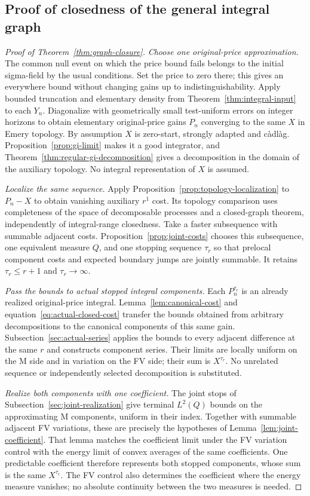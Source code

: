 \subsection{Proof of closedness of the general integral graph}
\label{sec:closure-proof}
\begin{proof}[Proof of Theorem~\ref{thm:graph-closure}]
\emph{Choose one original-price approximation.}
The common null event on which the price bound fails belongs to the initial sigma-field by the usual conditions. Set the price to zero there; this gives an everywhere bound without changing gains up to indistinguishability. Apply bounded truncation and elementary density from
Theorem~\ref{thm:integral-input} to each $Y_n$.
Diagonalize with geometrically small test-uniform errors on integer horizons
to obtain elementary original-price gains $P_n$ converging to the same $X$
in Emery topology. By assumption $X$ is zero-start, strongly adapted and
c\`adl\`ag. Proposition~\ref{prop:gi-limit} makes it a good integrator, and
Theorem~\ref{thm:regular-gi-decomposition} gives a decomposition in the domain
of the auxiliary topology. No integral representation of $X$ is assumed.

\emph{Localize the same sequence.}
Apply Proposition~\ref{prop:topology-localization} to $P_n-X$ to obtain
vanishing auxiliary $r^1$ cost. Its topology comparison uses completeness
of the space of decomposable processes and a closed-graph theorem,
independently of integral-range closedness. Take a faster subsequence with
summable adjacent costs. Proposition~\ref{prop:joint-costs} chooses this
subsequence, one equivalent measure $Q$, and one stopping sequence $\tau_r$
so that prelocal component costs and expected boundary jumps are jointly
summable. It retains $\tau_r\leq r+1$ and $\tau_r\to\infty$.

\emph{Pass the bounds to actual stopped integral components.}
Each $P_n^{\tau_r}$ is an already realized original-price integral.
Lemma~\ref{lem:canonical-cost} and equation~\eqref{eq:actual-closed-cost}
transfer the bounds obtained from arbitrary decompositions to the canonical
components of this same gain. Subsection~\ref{sec:actual-series} applies the
bounds to every adjacent difference at the same $r$ and constructs component
series. Their limits are locally uniform on the M side and in variation on
the FV side; their sum is $X^{\tau_r}$. No unrelated sequence or independently
selected decomposition is substituted.

\emph{Realize both components with one coefficient.}
The joint stops of Subsection~\ref{sec:joint-realization} give terminal
$L^2(Q)$ bounds on the approximating M components, uniform in their index.
Together with summable adjacent FV variations, these are precisely the
hypotheses of Lemma~\ref{lem:joint-coefficient}. That lemma matches the
coefficient limit under the FV variation control with the energy limit
of convex averages of the same coefficients. One predictable coefficient
therefore represents both stopped components, whose sum is the same
$X^{\tau_r}$. The FV control also determines the coefficient where the energy
measure vanishes; no absolute continuity between the two measures is needed.


\end{proof}

